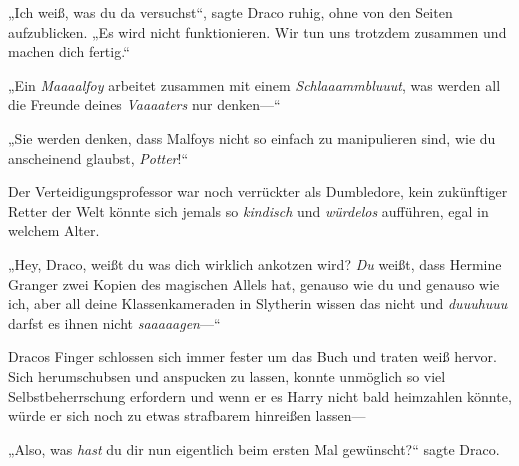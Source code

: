 „Ich weiß, was du da versuchst“, sagte Draco ruhig, ohne von den Seiten aufzublicken. „Es wird nicht funktionieren. Wir tun uns trotzdem zusammen und machen dich fertig.“

„Ein \emph{Maaaalfoy} arbeitet zusammen mit einem \emph{Schlaaammbluuut}, was werden all die Freunde deines \emph{Vaaaaters} nur denken—“

„Sie werden denken, dass Malfoys nicht so einfach zu manipulieren sind, wie du anscheinend glaubst, \emph{Potter}!“

Der Verteidigungsprofessor war noch verrückter als Dumbledore, kein zukünftiger Retter der Welt könnte sich jemals so \emph{kindisch} und \emph{würdelos} aufführen, egal in welchem Alter.

„Hey, Draco, weißt du was dich wirklich ankotzen wird? \emph{Du} weißt, dass Hermine Granger zwei Kopien des magischen Allels hat, genauso wie du und genauso wie ich, aber all deine Klassenkameraden in Slytherin wissen das nicht und \emph{duuuhuuu} darfst es ihnen nicht \emph{saaaaagen}—“

Dracos Finger schlossen sich immer fester um das Buch und traten weiß hervor. Sich herumschubsen und anspucken zu lassen, konnte unmöglich so viel Selbstbeherrschung erfordern und wenn er es Harry nicht bald heimzahlen könnte, würde er sich noch zu etwas strafbarem hinreißen lassen—

„Also, was \emph{hast} du dir nun eigentlich beim ersten Mal gewünscht?“ sagte Draco.

